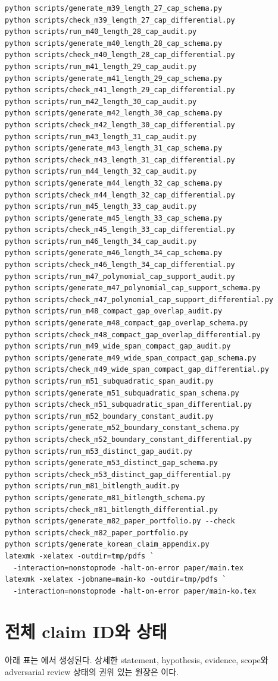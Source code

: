 \documentclass[11pt]{article}
\begin{document}
\begin{verbatim}
python scripts/generate_m39_length_27_cap_schema.py
python scripts/check_m39_length_27_cap_differential.py
python scripts/run_m40_length_28_cap_audit.py
python scripts/generate_m40_length_28_cap_schema.py
python scripts/check_m40_length_28_cap_differential.py
python scripts/run_m41_length_29_cap_audit.py
python scripts/generate_m41_length_29_cap_schema.py
python scripts/check_m41_length_29_cap_differential.py
python scripts/run_m42_length_30_cap_audit.py
python scripts/generate_m42_length_30_cap_schema.py
python scripts/check_m42_length_30_cap_differential.py
python scripts/run_m43_length_31_cap_audit.py
python scripts/generate_m43_length_31_cap_schema.py
python scripts/check_m43_length_31_cap_differential.py
python scripts/run_m44_length_32_cap_audit.py
python scripts/generate_m44_length_32_cap_schema.py
python scripts/check_m44_length_32_cap_differential.py
python scripts/run_m45_length_33_cap_audit.py
python scripts/generate_m45_length_33_cap_schema.py
python scripts/check_m45_length_33_cap_differential.py
python scripts/run_m46_length_34_cap_audit.py
python scripts/generate_m46_length_34_cap_schema.py
python scripts/check_m46_length_34_cap_differential.py
python scripts/run_m47_polynomial_cap_support_audit.py
python scripts/generate_m47_polynomial_cap_support_schema.py
python scripts/check_m47_polynomial_cap_support_differential.py
python scripts/run_m48_compact_gap_overlap_audit.py
python scripts/generate_m48_compact_gap_overlap_schema.py
python scripts/check_m48_compact_gap_overlap_differential.py
python scripts/run_m49_wide_span_compact_gap_audit.py
python scripts/generate_m49_wide_span_compact_gap_schema.py
python scripts/check_m49_wide_span_compact_gap_differential.py
python scripts/run_m51_subquadratic_span_audit.py
python scripts/generate_m51_subquadratic_span_schema.py
python scripts/check_m51_subquadratic_span_differential.py
python scripts/run_m52_boundary_constant_audit.py
python scripts/generate_m52_boundary_constant_schema.py
python scripts/check_m52_boundary_constant_differential.py
python scripts/run_m53_distinct_gap_audit.py
python scripts/generate_m53_distinct_gap_schema.py
python scripts/check_m53_distinct_gap_differential.py
python scripts/run_m81_bitlength_audit.py
python scripts/generate_m81_bitlength_schema.py
python scripts/check_m81_bitlength_differential.py
python scripts/generate_m82_paper_portfolio.py --check
python scripts/check_m82_paper_portfolio.py
python scripts/generate_korean_claim_appendix.py
latexmk -xelatex -outdir=tmp/pdfs `
  -interaction=nonstopmode -halt-on-error paper/main.tex
latexmk -xelatex -jobname=main-ko -outdir=tmp/pdfs `
  -interaction=nonstopmode -halt-on-error paper/main-ko.tex
\end{verbatim}

\appendix
\section{전체 claim ID와 상태}

아래 표는 에서 생성된다. 상세한
statement, hypothesis, evidence, scope와 adversarial review 상태의
권위 있는 원장은 이다.




\small

\end{document}
